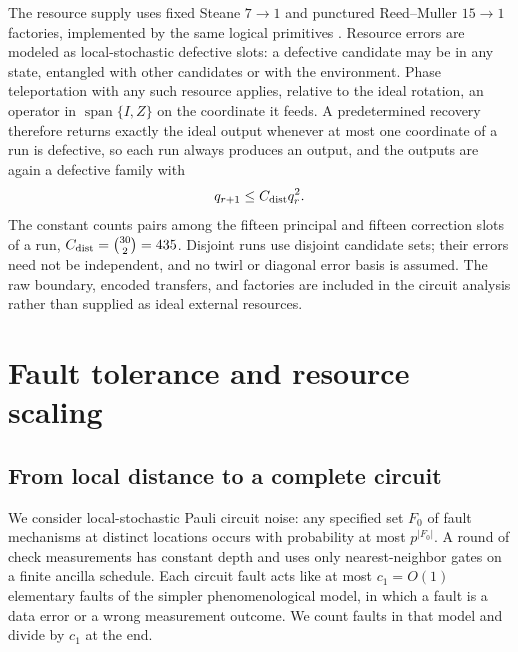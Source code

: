 The resource supply uses fixed Steane $7\!\to\!1$ and punctured Reed--Muller
$15\!\to\!1$ factories, implemented by the same logical primitives
\cite{BravyiKitaev,Reichardt,LitinskiMSD}.  Resource errors are modeled as
local-stochastic defective slots: a defective candidate may be in any state,
entangled with other candidates or with the environment.  Phase teleportation
with any such resource applies, relative to the ideal rotation, an operator in
$\operatorname{span}\{I,Z\}$ on the coordinate it feeds.  A predetermined
recovery therefore returns exactly the ideal output whenever at most one
coordinate of a run is defective, so each run always produces an output, and
the outputs are again a defective family with
\begin{equation}
 q_{r+1}\le C_{\rm dist}q_r^2.
 \label{eq:distill}
\end{equation}
The constant counts pairs among the fifteen principal and fifteen correction slots of a run, $C_{\rm dist}=\binom{30}{2}=435$.  Disjoint runs
use disjoint candidate sets; their errors need not be independent, and no
twirl or diagonal error basis is assumed. The raw
boundary, encoded transfers, and factories are included in the circuit
analysis rather than supplied as ideal external resources.

\section{Fault tolerance and resource scaling}
\label{sec:ft-main}
\subsection{From local distance to a complete circuit}
We consider local-stochastic Pauli circuit noise: any specified set $F_0$ of
fault mechanisms at distinct locations occurs with probability at most
$p^{|F_0|}$.  A round of check measurements has constant depth and uses only
nearest-neighbor gates on a finite ancilla schedule.  Each circuit fault acts
like at most $c_1=O(1)$ elementary faults of the simpler phenomenological
model, in which a fault is a data error or a wrong measurement outcome.  We
count faults in that model and divide by $c_1$ at the end.

